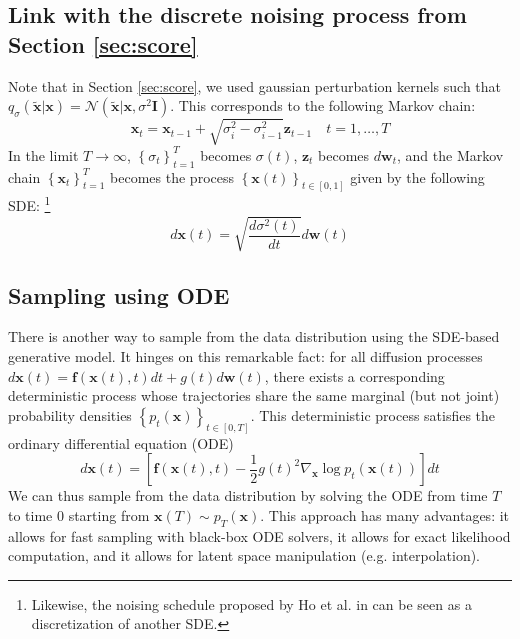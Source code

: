 \documentclass{article}
\begin{document}
\subsection{Link with the discrete noising process from Section \ref{sec:score}}
Note that in Section \ref{sec:score}, we used gaussian perturbation kernels such that $q_\sigma(\tilde {\mathbf{x}}|\mathbf{x}) = \mathcal{N}(\tilde {\mathbf{x}}|\mathbf{x}, \sigma^2 \mathbf{I})$.
This corresponds to the following Markov chain:
\begin{equation}
    \mathbf{x}_t = \mathbf{x}_{t-1} + \sqrt{\sigma_i^2 - \sigma_{i-1}^2} \mathbf{z}_{t-1} \quad t = 1, \ldots, T
\end{equation}
In the limit $T \to \infty$, $\left \{ \sigma_t \right \}_{t=1}^T$ becomes $\sigma(t)$, $\mathbf{z}_t$ becomes $d\mathbf{w}_t$, and the Markov chain $\left \{ \mathbf{x}_t \right \}_{t=1}^T$ becomes 
the process $\left \{ \mathbf{x}(t) \right \}_{t\in[0,1]}$ given by the following SDE:
\footnote{Likewise, the noising schedule proposed by Ho et al. in \cite{ho} can be seen as a discretization of another SDE.}
\begin{equation}
    d\mathbf{x}(t) = \sqrt{\frac{d\sigma^2(t)}{dt}} d\mathbf{w}(t)
\end{equation}

\subsection{Sampling using ODE}
There is another way to sample from the data distribution using the SDE-based generative model. It hinges on this remarkable fact: for all diffusion processes 
$d\mathbf{x}(t) = \mathbf{f}(\mathbf{x}(t),t)dt + g(t)d\mathbf{w}(t)$, there exists a corresponding deterministic process whose trajectories share the same marginal 
(but not joint) probability densities $\left \{ p_t(\mathbf{x}) \right \}_{t\in[0,T]}$.
This deterministic process satisfies the ordinary differential equation (ODE)
\begin{equation}
    d\mathbf{x}(t) = \left[ \mathbf{f}(\mathbf{x}(t), t) - \frac{1}{2}g(t)^2 \nabla_\mathbf{x} \log p_t(\mathbf{x}(t)) \right] dt
\end{equation}
We can thus sample from the data distribution by solving the ODE from time $T$ to time $0$ starting from $\mathbf{x}(T) \sim p_T(\mathbf{x})$. This approach has many advantages:
it allows for fast sampling with black-box ODE solvers, it allows for exact likelihood computation, and it allows for latent space manipulation (e.g. interpolation).
\end{document}
